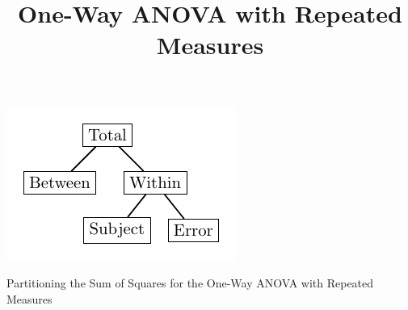 \documentclass{tufte-handout}
\title{One-Way ANOVA with Repeated Measures}
\date{} %
\begin{document}
\maketitle%




\begin{marginfigure}[50pt]
  \includegraphics[width=\linewidth]{anova_partition_one_way_repeat}%
  \label{fig:fullfig}%
  \caption{Partitioning the Sum of Squares for the One-Way ANOVA with Repeated Measures}
\end{marginfigure}
\end{document}
